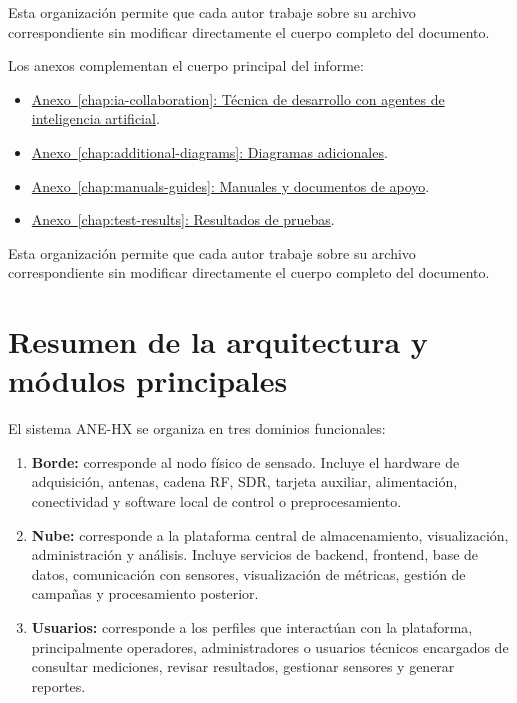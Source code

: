 Esta organización permite que cada autor trabaje sobre su archivo correspondiente sin modificar directamente el cuerpo completo del documento.

Los anexos complementan el cuerpo principal del informe:

\begin{itemize}[leftmargin=*]
    \item \hyperref[chap:ia-collaboration]{Anexo~\ref*{chap:ia-collaboration}: Técnica de desarrollo con agentes de inteligencia artificial}.
    \item \hyperref[chap:additional-diagrams]{Anexo~\ref*{chap:additional-diagrams}: Diagramas adicionales}.
    \item \hyperref[chap:manuals-guides]{Anexo~\ref*{chap:manuals-guides}: Manuales y documentos de apoyo}.
    \item \hyperref[chap:test-results]{Anexo~\ref*{chap:test-results}: Resultados de pruebas}.
\end{itemize}

Esta organización permite que cada autor trabaje sobre su archivo correspondiente sin modificar directamente el cuerpo completo del documento.

\section{Resumen de la arquitectura y módulos principales}

El sistema ANE-HX se organiza en tres dominios funcionales:

\begin{enumerate}[leftmargin=*]
    \item \textbf{Borde:} corresponde al nodo físico de sensado. Incluye el hardware de adquisición, antenas, cadena RF, SDR, tarjeta auxiliar, alimentación, conectividad y software local de control o preprocesamiento.
    
    \item \textbf{Nube:} corresponde a la plataforma central de almacenamiento, visualización, administración y análisis. Incluye servicios de backend, frontend, base de datos, comunicación con sensores, visualización de métricas, gestión de campañas y procesamiento posterior.
    
    \item \textbf{Usuarios:} corresponde a los perfiles que interactúan con la plataforma, principalmente operadores, administradores o usuarios técnicos encargados de consultar mediciones, revisar resultados, gestionar sensores y generar reportes.
\end{enumerate}

